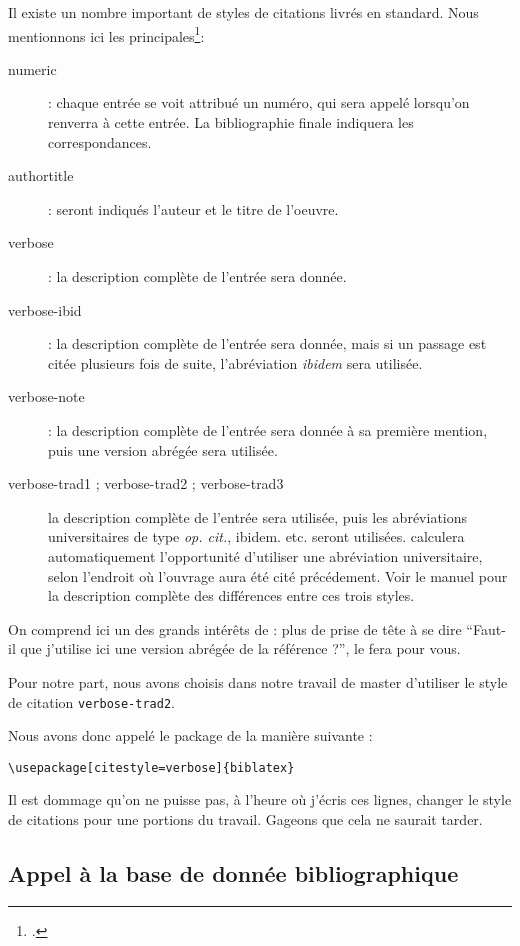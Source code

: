 Il existe un nombre important de styles de citations livrés en standard. Nous mentionnons ici les principales\footcite[Se reporter à][-61 pour plus de détails.]{biblatex}:
\begin{description}
\item[numeric] : chaque entrée se voit attribué un numéro, qui sera appelé lorsqu'on renverra à cette entrée. La bibliographie finale indiquera les correspondances.
\item[authortitle] : seront indiqués l'auteur et le titre de l'oeuvre.
\item[verbose]    : la description complète de l'entrée sera donnée.
\item[verbose-ibid] : la description complète de l'entrée sera donnée, mais si un passage est citée plusieurs fois de suite, l'abréviation \emph{ibidem} sera utilisée.
\item[verbose-note] : la description complète de l'entrée sera donnée à sa première mention, puis une version abrégée sera utilisée.
\item[verbose-trad1 ; verbose-trad2 ; verbose-trad3] la description complète de l'entrée sera utilisée, puis les abréviations universitaires de type \emph{op. cit.}, {ibidem.} etc. seront utilisées.  calculera automatiquement l'opportunité d'utiliser une abréviation universitaire, selon l'endroit où l'ouvrage aura été cité précédement. Voir le manuel pour la description complète des différences entre ces trois styles.
\end{description}

On comprend ici un des grands intérêts de \logiciel{\LaTeX} : plus de prise de tête à se dire \enquote{Faut-il que j'utilise ici une version abrégée de la référence ?},  le fera pour vous.

Pour notre part, nous avons choisis dans notre travail de master d'utiliser le style de citation \verb|verbose-trad2|.

Nous avons donc appelé le package de la manière suivante : 
\begin{verbatim}
\usepackage[citestyle=verbose]{biblatex}
\end{verbatim}

Il est dommage qu'on ne puisse pas, à l'heure où j'écris ces lignes, changer le style de citations pour une portions du travail. Gageons que cela ne saurait tarder.

\subsection{Appel à la base de donnée bibliographique}

